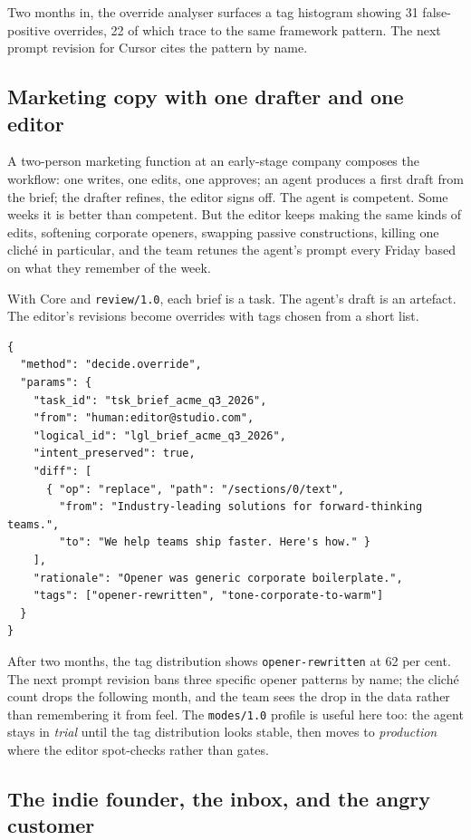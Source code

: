 \documentclass[11pt]{article}
\begin{document}
Two months in, the override analyser surfaces a tag histogram showing 31 false-positive overrides, 22 of which trace to the same framework pattern. The next prompt revision for Cursor cites the pattern by name.

\subsection{Marketing copy with one drafter and one editor}

A two-person marketing function at an early-stage company composes the workflow: one writes, one edits, one approves; an agent produces a first draft from the brief; the drafter refines, the editor signs off. The agent is competent. Some weeks it is better than competent. But the editor keeps making the same kinds of edits, softening corporate openers, swapping passive constructions, killing one cliché in particular, and the team retunes the agent's prompt every Friday based on what they remember of the week.

With Core and \texttt{review/1.0}, each brief is a task. The agent's draft is an artefact. The editor's revisions become overrides with tags chosen from a short list.

\begin{lstlisting}[caption={Editor override with tag taxonomy.},label={lst:case2-override}]
{
  "method": "decide.override",
  "params": {
    "task_id": "tsk_brief_acme_q3_2026",
    "from": "human:editor@studio.com",
    "logical_id": "lgl_brief_acme_q3_2026",
    "intent_preserved": true,
    "diff": [
      { "op": "replace", "path": "/sections/0/text",
        "from": "Industry-leading solutions for forward-thinking teams.",
        "to": "We help teams ship faster. Here's how." }
    ],
    "rationale": "Opener was generic corporate boilerplate.",
    "tags": ["opener-rewritten", "tone-corporate-to-warm"]
  }
}
\end{lstlisting}

After two months, the tag distribution shows \texttt{opener-rewritten} at 62 per cent. The next prompt revision bans three specific opener patterns by name; the cliché count drops the following month, and the team sees the drop in the data rather than remembering it from feel. The \texttt{modes/1.0} profile is useful here too: the agent stays in \emph{trial} until the tag distribution looks stable, then moves to \emph{production} where the editor spot-checks rather than gates.

\subsection{The indie founder, the inbox, and the angry customer}
\end{document}
